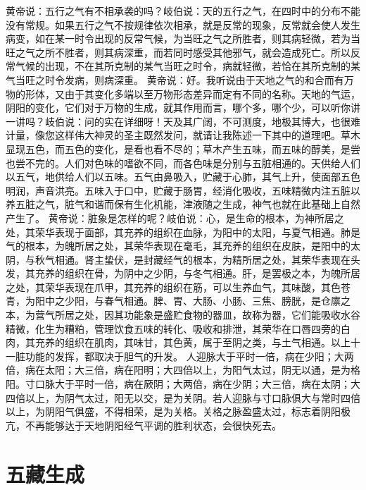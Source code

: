 \documentclass[a4paper,12pt,UTF8,twoside]{ctexbook}
\begin{document}
黄帝说：五行之气有不相承袭的吗？岐伯说：天的五行之气，在四时中的分布不能没有常规。如果五行之气不按规律依次相承，就是反常的现象，反常就会使人发生病变，如在某一时令出现的反常气候，为当旺之气之所胜者，则其病轻微，若为当旺之气之所不胜者，则其病深重，而若同时感受其他邪气，就会造成死亡。所以反常气候的出现，不在其所克制的某气当旺之时令，病就轻微，若恰在其所克制的某气当旺之时令发病，则病深重。
黄帝说：好。我听说由于天地之气的和合而有万物的形体，又由于其变化多端以至万物形态差异而定有不同的名称。天地的气运，阴阳的变化，它们对于万物的生成，就其作用而言，哪个多，哪个少，可以听你讲一讲吗？岐伯说：问的实在详细呀！天及其广阔，不可测度，地极其博大，也很难计量，像您这样伟大神灵的圣主既然发问，就请让我陈述一下其中的道理吧。草木显现五色，而五色的变化，是看也看不尽的；草木产生五味，而五味的醇美，是尝也尝不完的。人们对色味的嗜欲不同，而各色味是分别与五脏相通的。天供给人们以五气，地供给人们以五味。五气由鼻吸入，贮藏于心肺，其气上升，使面部五色明润，声音洪亮。五味入于口中，贮藏于肠胃，经消化吸收，五味精微内注五脏以养五脏之气，脏气和谐而保有生化机能，津液随之生成，神气也就在此基础上自然产生了。
黄帝说：脏象是怎样的呢？岐伯说：心，是生命的根本，为神所居之处，其荣华表现于面部，其充养的组织在血脉，为阳中的太阳，与夏气相通。肺是气的根本，为魄所居之处，其荣华表现在毫毛，其充养的组织在皮肤，是阳中的太阴，与秋气相通。肾主蛰伏，是封藏经气的根本，为精所居之处，其荣华表现在头发，其充养的组织在骨，为阴中之少阴，与冬气相通。肝，是罢极之本，为魄所居之处，其荣华表现在爪甲，其充养的组织在筋，可以生养血气，其味酸，其色苍青，为阳中之少阳，与春气相通。脾、胃、大肠、小肠、三焦、膀胱，是仓廪之本，为营气所居之处，因其功能象是盛贮食物的器皿，故称为器，它们能吸收水谷精微，化生为糟粕，管理饮食五味的转化、吸收和排泄，其荣华在口唇四旁的白肉，其充养的组织在肌肉，其味甘，其色黄，属于至阴之类，与土气相通。以上十一脏功能的发挥，都取决于胆气的升发。
人迎脉大于平时一倍，病在少阳；大两倍，病在太阳；大三倍，病在阳明；大四倍以上，为阳气太过，阴无以通，是为格阳。寸口脉大于平时一倍，病在厥阴；大两倍，病在少阴；大三倍，病在太阴；大四倍以上，为阴气太过，阳无以交，是为关阴。若人迎脉与寸口脉俱大与常时四倍以上，为阴阳气俱盛，不得相荣，是为关格。关格之脉盈盛太过，标志着阴阳极亢，不再能够达于天地阴阳经气平调的胜利状态，会很快死去。

\chapter{五藏生成}
\end{document}
